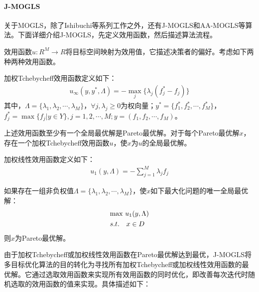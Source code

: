             \paragraph{J-MOGLS}
            关于MOGLS，除了Ishibuchi等系列工作之外，还有J-MOGLS和AA-MOGLS等算法。下面详细介绍J-MOGLS，先定义效用函数，然后描述算法流程。
            \par
            效用函数$u:{R}^M\to R$将目标空间映射为效用值，它描述决策者的偏好。考虑如下两种两种效用函数。
            \begin{definition}[加权Tchebycheff效用函数]
            加权Tchebycheff效用函数定义如下：
            \begin{align}
              u_{\infty}(y,y^{*},\Lambda) = -\mathop{\max}\limits_{j}\{{\lambda}_j(f_j^*-f_j)\}
            \end{align}
            其中，$\Lambda=\{{\lambda}_1,{\lambda}_2,\cdots,{\lambda}_M\}$，$\forall j,{\lambda}_j\ge 0$为权向量；$y^*=\{f_1^*,f_2^*,\cdots,f_M^*\}$，$f_j^*={\max}\{f_j|y\in Y\},j=1,2,\cdots,M;y=(f_1,f_2,\cdots,f_M)$。
            \end{definition}
            \par
            上述效用函数至少有一个全局最优解是Pareto最优解。对于每个Pareto最优解$x$，存在一个加权Tchebycheff效用函数$u$，使$x$为$u$的全局最优解。
            \begin{definition}[加权线性效用函数]
            加权线性效用函数定义如下：
                \begin{align*}
                  u_{1}(y,\Lambda) = -\mathop{\sum}\limits_{j=1}^M{\lambda}_jf_j
                \end{align*}
            \end{definition}
            \par
            如果存在一组非负权值$\Lambda=\{{\lambda}_1,{\lambda}_2,\cdots,{\lambda}_M\}$，使$x$如下最大化问题的唯一全局最优解：
            \begin{align*}
              & {\max}\ u_{1}(y,\Lambda)\\\notag
              & s.t.\quad x\in D
            \end{align*}
            则$x$为Pareto最优解。
            \par
            由于加权Tchebycheff或加权线性效用函数在Pareto最优解达到最优，J-MOGLS将多目标优化算法的目的转化为寻找所有加权Tchebycheff或加权线性效用函数的最优解。它通过选取效用函数来实现所有效用函数的同时优化，即改善每次迭代时随机选取的效用函数的值来实现。具体描述如下：\\
